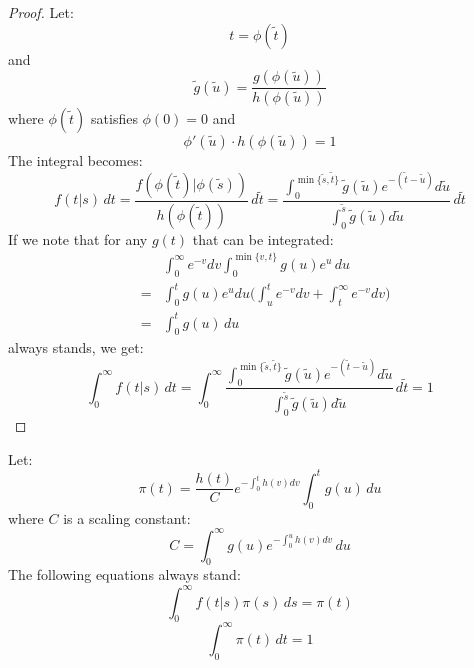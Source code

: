 \documentclass[pdftex,10pt]{article}
\begin{document}
\begin{proof}
Let:
\[t=\phi(\tilde t)\]
and
\[\tilde g(\tilde u)=\frac{g(\phi(\tilde u))}{h(\phi(\tilde u))}\]
where $\phi(\tilde t)$ satisfies $\phi(0)=0$ and
\[\phi'(\tilde u)\cdot h(\phi(\tilde u))=1\]
The integral becomes:
\[f(t|s)\,dt=\frac{f(\phi(\tilde t)|\phi(\tilde s))}{h(\phi(\tilde t))}\,d\tilde t
=\frac{\int_0^{\min\{\tilde s,\tilde t\}}\tilde g(\tilde u)e^{-(\tilde t-\tilde u)}d\tilde u}
{\int_0^{\tilde s}\tilde g(\tilde u)d\tilde u}\,d\tilde t\]
If we note that for any $g(t)$ that can be integrated:
\begin{eqnarray*}
  &&\int_0^{\infty}e^{-v}dv\int_0^{\min\{v,t\}}g(u)e^u\,du\\
  &=&\int_0^tg(u)e^udu\Bigg(\int_u^te^{-v}dv+\int_t^{\infty}e^{-v}dv\Bigg)\\
  &=&\int_0^tg(u)\,du
\end{eqnarray*}
always stands, we get:
\[\int_0^{\infty}f(t|s)\,dt=\int_0^{\infty}\frac{\int_0^{\min\{\tilde s,\tilde t\}}\tilde g(\tilde u)e^{-(\tilde t-\tilde u)}d\tilde u}
{\int_0^{\tilde s}\tilde g(\tilde u)d\tilde u}\,d\tilde t=1\]
\end{proof}

\begin{lem}\label{lem:sd}
  Let:
  \begin{equation}\label{equ:pi}
    \pi(t)=\frac{h(t)}{C}e^{-\int_0^th(v)dv}\int_0^tg(u)\,du
  \end{equation}
  where $C$ is a scaling constant:
  \begin{equation}
    C=\int_0^{\infty}g(u)e^{-\int_0^uh(v)dv}\,du
  \end{equation}
  The following equations always stand:
  \begin{equation*}
    \int_0^{\infty}f(t|s)\pi(s)\,ds=\pi(t)
  \end{equation*}
  \begin{equation*}
    \int_0^{\infty}\pi(t)\,dt=1
  \end{equation*}
\end{lem}
\end{document}
